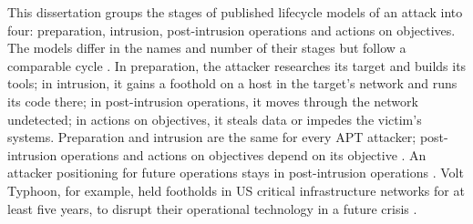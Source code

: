 \documentclass{cshonours}
\begin{document}
This dissertation groups the stages of published lifecycle models of an attack
\citep{hutchins2011, mandiant2013, alshamrani2019} into four: preparation,
intrusion, post-intrusion operations and actions on objectives. The models
differ in the names and number of their stages but follow a comparable
cycle \citep{chemat2024}. In preparation, the attacker researches its
target and builds its tools; in intrusion, it gains a foothold on a host in
the target's network and runs its code there; in post-intrusion operations,
it moves through the network undetected; in actions on objectives, it
steals data or impedes the victim's systems. Preparation and intrusion are
the same for every APT attacker; post-intrusion operations and actions on
objectives depend on its objective \citep{alshamrani2019}. An attacker
positioning for future operations stays in post-intrusion operations
\citep{alshamrani2019}. Volt Typhoon, for example, held footholds in US
critical infrastructure networks for at least five years, to disrupt their
operational technology in a future crisis \citep{cisaaa24038a}.
\end{document}
